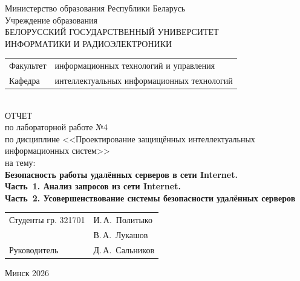 \begin{titlepage}
	\begin{center}
		Министерство образования Республики Беларусь\\[1em]
		Учреждение образования\\
		БЕЛОРУССКИЙ ГОСУДАРСТВЕННЫЙ УНИВЕРСИТЕТ \\
		ИНФОРМАТИКИ И РАДИОЭЛЕКТРОНИКИ\\[1em]
		
		\begin{minipage}{\textwidth}
			\begin{flushleft}
				\begin{tabular}{ l l }
					Факультет & информационных технологий и управления\\
					Кафедра   & интеллектуальных информационных технологий
				\end{tabular}
			\end{flushleft}
		\end{minipage}\\[1em]
		
		{ОТЧЕТ}\\
		{по лабораторной работе №4}\\
		{по дисциплине <<Проектирование защищённых интеллектуальных}\\
		{информационных систем>>}\\
		{на тему:}\\[1em]
		\textbf{Безопасность работы удалённых серверов в сети Internet.}\\[0.4em]
		\textbf{Часть~1. Анализ запросов из сети Internet.}\\[0.25em]
		\textbf{Часть~2. Усовершенствование системы безопасности удалённых серверов}\\[1em]
		
		\vspace{2em}
		\begin{tabular}{ p{}p{} }
			Студенты гр. 321701 & И.\,А.~Политыко \\
			& В.\,А.~Лукашов \\
			Руководитель & Д.\,А.~Сальников \\
		\end{tabular}
		
		\vfill
		{\normalsize Минск 2026}
	\end{center}
\end{titlepage}
